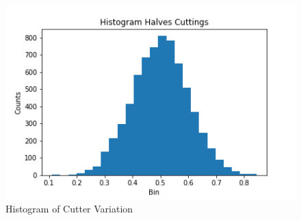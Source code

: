 \documentclass[10pt,a4paper]{article}
\begin{document}
\begin{figure}[H]
\centering\includegraphics[width=1\linewidth,height=0.25\textheight]{Fig02}
\caption{Histogram of Cutter Variation}
\label{fig:Fig02}
\end{figure}
\end{document}
